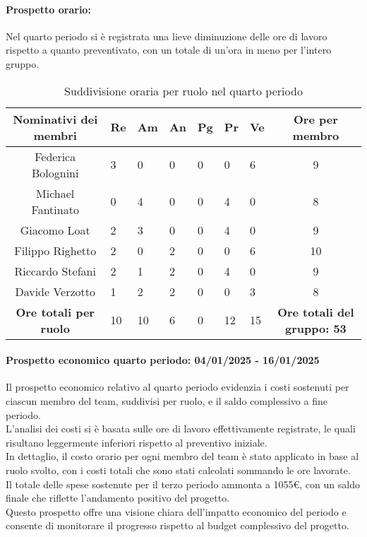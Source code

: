 \paragraph{Prospetto orario: }
Nel quarto periodo si è registrata una lieve diminuzione delle ore di lavoro rispetto a quanto preventivato, con un totale di un'ora in meno per l'intero gruppo.\\
\begin{table}[h!]
    \centering
    \renewcommand{\arraystretch}{1.5}
    \begin{tabularx}{\textwidth}{|c|X|X|X|X|X|X|c|}\hline
    \rowcolor[HTML]{FFD700} 
    \textbf{Nominativi dei membri} & \textbf{Re} & \textbf{Am} & \textbf{An} & \textbf{Pg} & \textbf{Pr} & \textbf{Ve} & \textbf{Ore per membro} \\ \hline
    Federica Bolognini & 3 & 0 & 0 & 0 & 0 & 6 & 9  \\ \hline
    Michael Fantinato  & 0 & 4 & 0 & 0 & 4 & 0 & 8  \\ \hline
    Giacomo Loat       & 2 & 3 & 0 & 0 & 4 & 0 & 9 \\ \hline
    Filippo Righetto   & 2 & 0 & 2 & 0 & 0 & 6 & 10 \\ \hline
    Riccardo Stefani   & 2 & 1 & 2 & 0 & 4 & 0 & 9 \\ \hline
    Davide Verzotto    & 1 & 2 & 2 & 0 & 0 & 3 & 8  \\ \hline
    \rowcolor[HTML]{FFD700} 
    \textbf{Ore totali per ruolo} & 10 & 10 & 6 & 0 & 12 & 15 & \textbf{Ore totali del gruppo: 53} \\ \hline
    \end{tabularx}
    \caption{Suddivisione oraria per ruolo nel quarto periodo}
\end{table}

\paragraph{Prospetto economico quarto periodo: 04/01/2025 - 16/01/2025}  
Il prospetto economico relativo al quarto periodo evidenzia i costi sostenuti per ciascun membro del team, suddivisi per ruolo, e il saldo complessivo a fine periodo.\\  
L'analisi dei costi si è basata sulle ore di lavoro effettivamente registrate, le quali risultano leggermente inferiori rispetto al preventivo iniziale.\\  
In dettaglio, il costo orario per ogni membro del team è stato applicato in base al ruolo svolto, con i costi totali che sono stati calcolati sommando le ore lavorate. \\
Il totale delle spese sostenute per il terzo periodo ammonta a 1055€, con un saldo finale che riflette l'andamento positivo del progetto. \\
Questo prospetto offre una visione chiara dell'impatto economico del periodo e consente di monitorare il progresso rispetto al budget complessivo del progetto.

